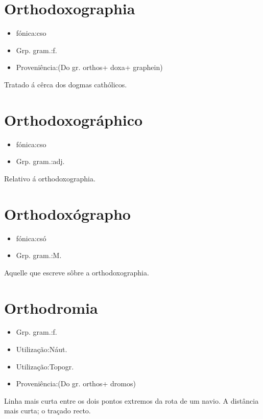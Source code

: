 \section{Orthodoxographia}
\begin{itemize}
\item {fónica:cso}
\end{itemize}
\begin{itemize}
\item {Grp. gram.:f.}
\end{itemize}
\begin{itemize}
\item {Proveniência:(Do gr. \textunderscore orthos\textunderscore  + \textunderscore doxa\textunderscore  + \textunderscore graphein\textunderscore )}
\end{itemize}
Tratado á cêrca dos dogmas cathólicos.
\section{Orthodoxográphico}
\begin{itemize}
\item {fónica:cso}
\end{itemize}
\begin{itemize}
\item {Grp. gram.:adj.}
\end{itemize}
Relativo á orthodoxographia.
\section{Orthodoxógrapho}
\begin{itemize}
\item {fónica:csó}
\end{itemize}
\begin{itemize}
\item {Grp. gram.:M.}
\end{itemize}
Aquelle que escreve sôbre a orthodoxographia.
\section{Orthodromia}
\begin{itemize}
\item {Grp. gram.:f.}
\end{itemize}
\begin{itemize}
\item {Utilização:Náut.}
\end{itemize}
\begin{itemize}
\item {Utilização:Topogr.}
\end{itemize}
\begin{itemize}
\item {Proveniência:(Do gr. \textunderscore orthos\textunderscore  + \textunderscore dromos\textunderscore )}
\end{itemize}
Linha mais curta entre os dois pontos extremos da rota de um navio.
A distância mais curta; o traçado recto.
